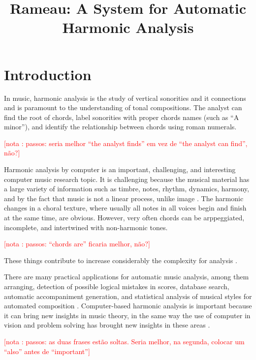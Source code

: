\documentclass{article}
\title{Rameau: A System for Automatic Harmonic Analysis}
\newcounter{notacounter}
\newcommand{\nota}[1]{
  \addtocounter{notacounter}{1}
  \textcolor{red}{[nota \arabic{notacounter}: #1]}
}
\begin{document}
\maketitle

\begin{abstract}

\end{abstract}

\section{Introduction}
\label{sec:introduction}

In music, harmonic analysis is the study of vertical sonorities and it
connections and is paramount to the understanding of tonal
compositions. The analyst can find the root of chords, label
sonorities with proper chords names (such as ``A minor''), and
identify the relationship between chords using roman
numerals. \nota{passos: seria melhor ``the analyst finds'' em vez de
  ``the analyst can find'', não?}

Harmonic analysis by computer is an important, challenging, and
interesting computer music research topic. It is challenging because
the musical material has a large variety of information such as
timbre, notes, rhythm, dynamics, harmony, and by the fact that music
is not a linear process, unlike image \cite{mouton.ea:numeric}. The
harmonic changes in a choral texture, where usually all notes in all
voices begin and finish at the same time, are obvious. However, very
often chords can be arppeggiated, incomplete, and intertwined with
non-harmonic tones. \nota{passos: ``chords are'' ficaria melhor, não?}
These things contribute to increase considerably the complexity for
analysis \cite{pardo.ea:automated}.

There are many practical applications for automatic music analysis,
among them arranging, detection of possible logical mistakes in
scores, database search, automatic accompaniment generation, and
statistical analysis of musical styles for automated composition
\cite{pardo.ea:algorithms,temperley.ea:modeling}. Computer-based
harmonic analysis is important because it can bring new insights in
music theory, in the same way the use of computer in vision and
problem solving has brought new insights in these areas
\cite{temperley.ea:modeling}. \nota{passos: as duas frases estão
  soltas. Seria melhor, na segunda, colocar um ``also'' antes de
  ``important''}
\end{document}
